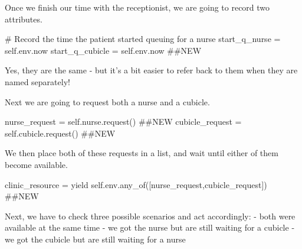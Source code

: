 \documentclass[
  letterpaper,
  DIV=11,
  numbers=noendperiod]{scrreprt}
\newenvironment{Shaded}{}{}
\newcommand{\CommentTok}[1]{\textcolor[rgb]{0.42,0.45,0.49}{#1}}
\newcommand{\ControlFlowTok}[1]{\textcolor[rgb]{0.84,0.23,0.29}{#1}}
\newcommand{\NormalTok}[1]{\textcolor[rgb]{0.14,0.16,0.18}{#1}}
\newcommand{\OperatorTok}[1]{\textcolor[rgb]{0.14,0.16,0.18}{#1}}
\newcommand{\VariableTok}[1]{\textcolor[rgb]{0.89,0.38,0.04}{#1}}
\begin{document}
Once we finish our time with the receptionist, we are going to record
two attributes.

\begin{Shaded}
\begin{Highlighting}[]
\CommentTok{\# Record the time the patient started queuing for a nurse}
\NormalTok{start\_q\_nurse }\OperatorTok{=} \VariableTok{self}\NormalTok{.env.now}
\NormalTok{start\_q\_cubicle }\OperatorTok{=} \VariableTok{self}\NormalTok{.env.now }\CommentTok{\#\#NEW}
\end{Highlighting}
\end{Shaded}

Yes, they are the same - but it's a bit easier to refer back to them
when they are named separately!

Next we are going to request both a nurse and a cubicle.

\begin{Shaded}
\begin{Highlighting}[]
\NormalTok{nurse\_request }\OperatorTok{=} \VariableTok{self}\NormalTok{.nurse.request()  }\CommentTok{\#\#NEW}
\NormalTok{cubicle\_request }\OperatorTok{=} \VariableTok{self}\NormalTok{.cubicle.request() }\CommentTok{\#\#NEW}
\end{Highlighting}
\end{Shaded}

We then place both of these requests in a list, and wait until either of
them become available.

\begin{Shaded}
\begin{Highlighting}[]
\NormalTok{clinic\_resource }\OperatorTok{=} \ControlFlowTok{yield} \VariableTok{self}\NormalTok{.env.any\_of([nurse\_request,cubicle\_request]) }\CommentTok{\#\#NEW}
\end{Highlighting}
\end{Shaded}

Next, we have to check three possible scenarios and act accordingly: -
both were available at the same time - we got the nurse but are still
waiting for a cubicle - we got the cubicle but are still waiting for a
nurse
\end{document}
